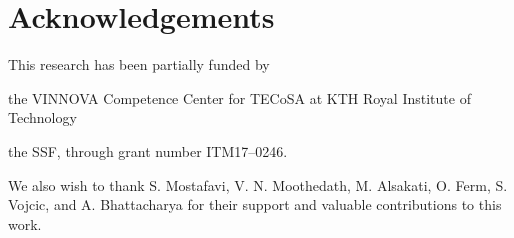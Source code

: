 \section*{Acknowledgements}\label{sec:acks}

This research has been partially funded by
\begin{enumerate*}[itemjoin={{; }}, itemjoin*={{; and }}]
    \item the VINNOVA Competence Center for \ac{TECoSA} at KTH Royal Institute of Technology
    \item the \ac{SSF}, through grant number ITM17--0246.
\end{enumerate*}

We also wish to thank S. Mostafavi, V. N. Moothedath, M. Alsakati, O. Ferm, S. Vojcic, and A. Bhattacharya for their support and valuable contributions to this work.
